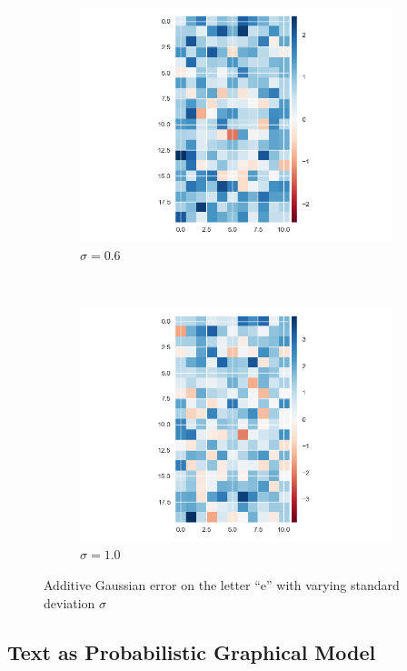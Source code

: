 \documentclass[10pt,twocolumn,letterpaper]{article}
\begin{document}
\begin{figure}
    \begin{subfigure}[b]{0.22\textwidth}
        \includegraphics[width=\textwidth]{60.png}
        \caption{$\sigma = 0.6$}
    \end{subfigure}
    ~ %
    \begin{subfigure}[b]{0.22\textwidth}
        \includegraphics[width=\textwidth]{100.png}
        \caption{$\sigma = 1.0$}
    \end{subfigure}
    \caption{\label{fig:e_images} Additive Gaussian error on the letter ``e'' with varying standard deviation $\sigma$}
\end{figure}

\subsection{Text as Probabilistic Graphical Model}
\end{document}
